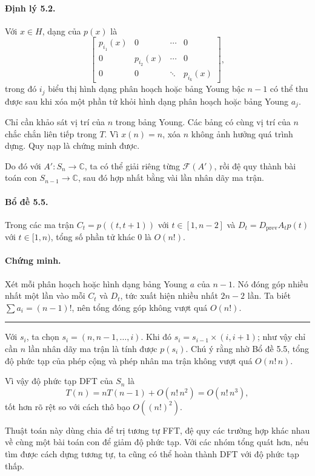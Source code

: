 \documentclass[11pt]{article}
\begin{document}
\paragraph{Định lý 5.2.}
Với $x\in H$, dạng của $p(x)$ là
\[
\begin{bmatrix}
p_{i_1}(x)&0&\cdots&0\\
0&p_{i_2}(x)&\cdots&0\\
0&0&\ddots&p_{i_k}(x)
\end{bmatrix},
\]
trong đó $i_j$ biểu thị hình dạng phân hoạch hoặc bảng Young bậc $n-1$ có thể
thu được sau khi xóa một phần tử khỏi hình dạng phân hoạch hoặc bảng Young
$a_j$.

Chỉ cần khảo sát vị trí của $n$ trong bảng Young. Các bảng có cùng vị trí của
$n$ chắc chắn liên tiếp trong $T$. Vì $x(n)=n$, xóa $n$ không ảnh hưởng quá
trình dựng. Quy nạp là chứng minh được.

Do đó với $A':S_n\to\mathbb C$, ta có thể giải riêng từng $\mathcal F(A')$, rồi
đệ quy thành bài toán con $S_{n-1}\to\mathbb C$, sau đó hợp nhất bằng vài lần
nhân dãy ma trận.

\paragraph{Bổ đề 5.5.}
Trong các ma trận
$C_t=p((t,t+1))$ với $t\in[1,n-2]$ và
$D_t=D_{\mathrm{prev}}A_t p(t)$ với $t\in[1,n)$, tổng số phần tử khác $0$ là
$O(n!)$.

\paragraph{Chứng minh.}
Xét mỗi phân hoạch hoặc hình dạng bảng Young $a$ của $n-1$. Nó đóng góp nhiều
nhất một lần vào mỗi $C_t$ và $D_t$, tức xuất hiện nhiều nhất $2n-2$ lần.
Ta biết $\sum a_i=(n-1)!$, nên tổng đóng góp không vượt quá $O(n!)$.
\hfill\rule{0.55em}{0.55em}

Với $s_i$, ta chọn $s_i=(n,n-1,\ldots,i)$. Khi đó $s_i=s_{i-1}\times(i,i+1)$;
như vậy chỉ cần $n$ lần nhân dãy ma trận là tính được $p(s_i)$. Chú ý rằng nhờ
Bổ đề 5.5, tổng độ phức tạp của phép cộng và phép nhân ma trận không vượt quá
$O(n!\,n)$.

Vì vậy độ phức tạp DFT của $S_n$ là
\[
  T(n)=nT(n-1)+O(n!\,n^2)=O(n!\,n^3),
\]
tốt hơn rõ rệt so với cách thô bạo $O((n!)^2)$.

Thuật toán này dùng chia để trị tương tự FFT, đệ quy các trường hợp khác nhau
về cùng một bài toán con để giảm độ phức tạp. Với các nhóm tổng quát hơn, nếu
tìm được cách dựng tương tự, ta cũng có thể hoàn thành DFT với độ phức tạp thấp.
\end{document}
